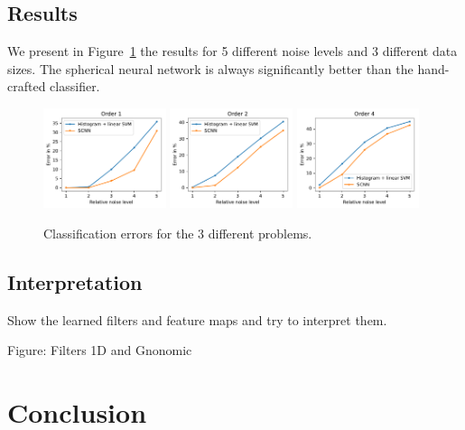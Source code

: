 \documentclass[final,twocolumn,3p,times,authoryear]{elsarticle}
\newcommand{\nati}[1]{{\color[rgb]{.1,.6,.1}{#1}}}
\newcommand{\assign}[1]{{\color[rgb]{.8,.5,.8}{Assigned: #1 }}}
\newcommand{\1}{\b{1}}              %
\newcommand{\0}{\b{0}}              %
\begin{document}
\subsection{Results}
\assign{Nathanaël, Tomek}

We present in Figure~\ref{fig:results} the results for 5 different noise levels and $3$ different data sizes. The spherical neural network is always significantly better than the hand-crafted classifier.

\begin{figure}[!ht]
\centering
\includegraphics[width=0.32\textwidth]{figures/result_order1.pdf}
\includegraphics[width=0.32\textwidth]{figures/result_order2.pdf}
\includegraphics[width=0.32\textwidth]{figures/result_order4.pdf}
\caption{Classification errors for the 3 different problems. \nati{TODO: order is not correct} }
\label{fig:results}
\end{figure}




\subsection{Interpretation}
\assign{Nathanaël, Tomek, Michaël}

Show the learned filters and feature maps and try to interpret them.

Figure: Filters 1D and Gnonomic

\section{Conclusion}
\label{sec:conclusion}
\assign{Nathanaël, Tomek, Michaël}
\end{document}
